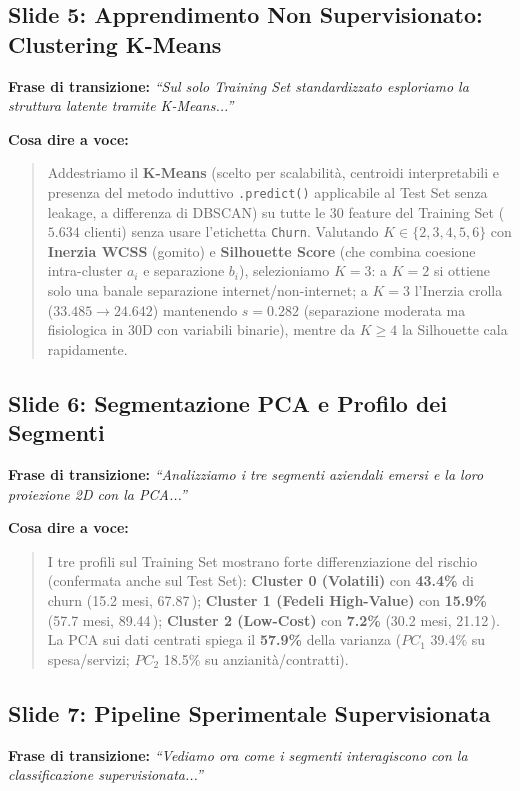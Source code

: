\documentclass[11pt, a4paper]{article}
\begin{document}
\subsection*{Slide 5: Apprendimento Non Supervisionato: Clustering K-Means}
\noindent \textbf{Frase di transizione:} \textit{``Sul solo Training Set standardizzato esploriamo la struttura latente tramite K-Means...''}

\noindent \textbf{Cosa dire a voce:}
\begin{quote}
Addestriamo il \textbf{K-Means} (scelto per scalabilità, centroidi interpretabili e presenza del metodo induttivo \texttt{.predict()} applicabile al Test Set senza leakage, a differenza di DBSCAN) su tutte le 30 feature del Training Set ($5.634$ clienti) senza usare l'etichetta \texttt{Churn}. Valutando $K \in \{2, 3, 4, 5, 6\}$ con \textbf{Inerzia WCSS} (gomito) e \textbf{Silhouette Score} (che combina coesione intra-cluster $a_i$ e separazione $b_i$), selezioniamo \textbf{$K=3$}: a $K=2$ si ottiene solo una banale separazione internet/non-internet; a $K=3$ l'Inerzia crolla ($33.485 \rightarrow 24.642$) mantenendo $s = 0.282$ (separazione moderata ma fisiologica in 30D con variabili binarie), mentre da $K \ge 4$ la Silhouette cala rapidamente.
\end{quote}

\subsection*{Slide 6: Segmentazione PCA e Profilo dei Segmenti}
\noindent \textbf{Frase di transizione:} \textit{``Analizziamo i tre segmenti aziendali emersi e la loro proiezione 2D con la PCA...''}

\noindent \textbf{Cosa dire a voce:}
\begin{quote}
I tre profili sul Training Set mostrano forte differenziazione del rischio (confermata anche sul Test Set): \textbf{Cluster 0 (Volatili)} con \textbf{43.4\%} di churn (15.2 mesi, 67.87\,\texteuro); \textbf{Cluster 1 (Fedeli High-Value)} con \textbf{15.9\%} (57.7 mesi, 89.44\,\texteuro); \textbf{Cluster 2 (Low-Cost)} con \textbf{7.2\%} (30.2 mesi, 21.12\,\texteuro). La PCA sui dati centrati spiega il \textbf{57.9\%} della varianza ($PC_1$ 39.4\% su spesa/servizi; $PC_2$ 18.5\% su anzianità/contratti).
\end{quote}

\subsection*{Slide 7: Pipeline Sperimentale Supervisionata}
\noindent \textbf{Frase di transizione:} \textit{``Vediamo ora come i segmenti interagiscono con la classificazione supervisionata...''}
\end{document}
